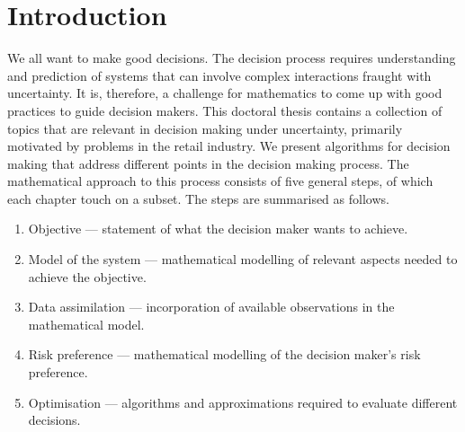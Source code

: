 \documentclass[main.tex]{subfiles}
\begin{document}
\chapter{Introduction}
We all want to make good decisions. The decision
process requires understanding and prediction of systems that can
involve complex interactions fraught with uncertainty. It is, therefore,
a challenge for mathematics to come up with good practices
to guide decision makers.
This doctoral thesis contains a collection of topics that are relevant
in decision making under uncertainty, primarily motivated by
problems in the retail industry.
We present algorithms for decision making that address different
points in the decision making process.
The mathematical approach to this process consists of
five general steps, of which each chapter touch on a subset.
The steps are summarised as follows.
\begin{enumerate}\label{enum:making_decisions}
\item Objective --- statement of what the decision maker wants to achieve.
\item Model of the system --- mathematical modelling of relevant aspects
  needed to achieve the objective.
\item Data assimilation --- incorporation of available observations in
  the mathematical model.
\item Risk preference --- mathematical modelling of the decision maker's risk
  preference.
\item Optimisation --- algorithms and approximations required to
  evaluate different decisions.
\end{enumerate}
\end{document}

